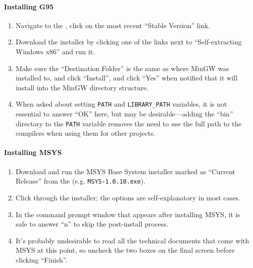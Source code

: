 \paragraph{Installing G95}

\begin{enumerate}

\item Navigate to the , click on the 
most recent ``Stable Version'' link.

\item Download the installer by clicking one of the links next to ``Self-extracting Windows x86'' 
and run it.

\item Make sure the ``Destination Folder'' is the same as where MinGW was installed to, and click 
``Install'', and click ``Yes'' when notified that it will install into the MinGW directory 
structure.

\item When asked about setting \verb|PATH| and \verb|LIBRARY_PATH| variables, it is not essential to 
answer ``OK'' here, but may be desirable---adding the ``bin'' directory to the \verb|PATH| variable 
removes the need to use the full path to the compilers when using them for other projects.

\end{enumerate}

\paragraph{Installing MSYS}

\begin{enumerate}

\item Download and run the MSYS Base System installer marked as ``Current Release'' from the 
 (e.g. \verb|MSYS-1.0.10.exe|).

\item Click through the installer; the options are self-explanatory in most cases.

\item In the command prompt window that appears after installing MSYS, it is safe to answer ``n'' to 
skip the post-install process.

\item It's probably undesirable to read all the technical documents that come with MSYS at this 
point, so uncheck the two boxes on the final screen before clicking ``Finish''.

\end{enumerate}

